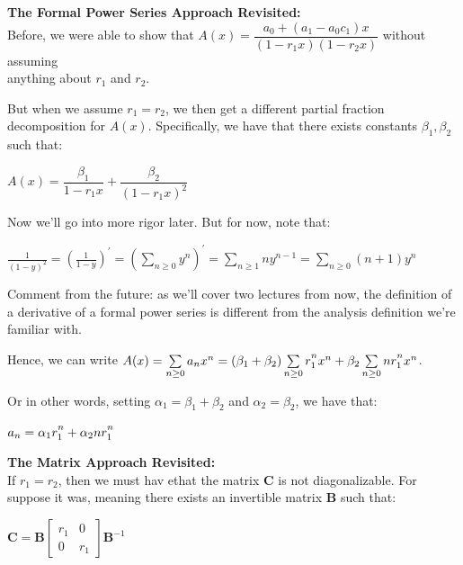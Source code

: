 \documentclass{book}
\newcommand{\hTwo}{%
\color{MidnightBlue}%
   \fontsize{13}{15}\selectfont%
}
\newcommand{\myComment}{%
   \color{RawerSienna}%
   \fontsize{12}{14}\selectfont%
}
\newenvironment{myIndent}{%
   \begin{adjustwidth}{2.5em}{0em}%
}{%
   \end{adjustwidth}%
}
\newenvironment{myTindent}{%
   \begin{adjustwidth}{7.5em}{0em}%
}{%
   \end{adjustwidth}%
}
\newcommand{\blab}[1]{\textbf{#1}}
\newcommand{\retTwo}{\hfill\bigbreak}
\begin{document}
\begin{myIndent}\hTwo
   \blab{The Formal Power Series Approach Revisited:}\\
   Before, we were able to show that $A(x) = \dfrac{a_0 + (a_1 - a_0c_1)x}{(1 - r_1x)(1 - r_2x)}$ without assuming\\ [-7pt] anything about $r_1$ and $r_2$.\newpage

   But when we assume $r_1 = r_2$, we then get a different partial fraction decomposition for $A(x)$. Specifically, we have that there exists constants $\beta_1, \beta_2$ such that:

   {\centering $A(x) = \dfrac{\beta_1}{1 - r_1x} + \dfrac{\beta_2}{(1 - r_1x)^2} $ \retTwo\par}

   Now we'll go into more rigor later. But for now, note that:

   {\centering $\frac{1}{(1 - y)^2} = \left(\frac{1}{1 - y}\right)^\prime = \left(\sum\limits_{n\geq 0}y^n\right)^\prime = \sum\limits_{n \geq 1}ny^{n-1} = \sum\limits_{n \geq 0}(n+1)y^n$\par}

   
   \begin{myTindent}\myComment
      Comment from the future: as we'll cover two lectures from now, the definition of a derivative of a formal power series is different from the analysis definition we're familiar with.\retTwo
   \end{myTindent}

   Hence, we can write $A(x) = \sum\limits_{n \geq 0}a_n x^n = (\beta_1 + \beta_2) \sum\limits_{n \geq 0}r_1^{\vphantom{|}n}x^n + \beta_2 \sum\limits_{n \geq 0}nr_1^{\vphantom{|}n}x^n$.\retTwo

   Or in other words, setting $\alpha_1 = \beta_1 + \beta_2$ and $\alpha_2 = \beta_2$, we have that:

   {\centering $a_n = \alpha_1r_1^{\vphantom{|}n} + \alpha_2 n r_1^{\vphantom{|}n}$\\ [20pt]\par}

   \blab{The Matrix Approach Revisited:}\\

   If $r_1 = r_2$, then we must hav ethat the matrix $\bm{C}$ is not diagonalizable. For suppose it was, meaning there exists an invertible matrix $\bm{B}$ such that:
   
   {\centering$\bm{C} = \bm{B}
   \begin{bmatrix}
      r_1 & 0\\ 0 & r_1
   \end{bmatrix}\bm{B}^{-1}$\retTwo\par}


\end{myIndent}
\end{document}
